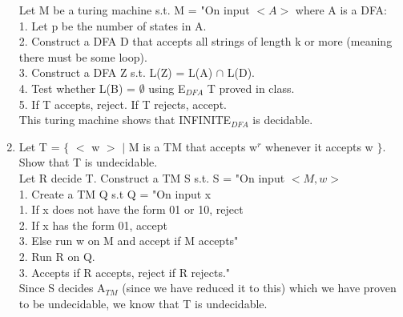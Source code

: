 \documentclass[12pt]{article}
\begin{document}
\begin{enumerate}
	\tabto{1cm}Let M be a turing machine s.t. M = "On input $<A>$ where A is a DFA: \\
	\tabto{2cm}1. Let p be the number of states in A. \\
	\tabto{2cm}2. Construct a DFA D that accepts all strings of length k or more (meaning 		\tabto{2cm}there must be some loop). \\
	\tabto{2cm}3. Construct a DFA Z s.t. L(Z) = L(A) $\cap$ L(D). \\
	\tabto{2cm}4. Test whether L(B) = $\emptyset$ using E$_{DFA}$ T proved in class. \\
	\tabto{2cm}5. If T accepts, reject. If T rejects, accept. \\ 
	
	This turing machine shows that INFINITE$_{DFA}$ is decidable.
	
	\item Let T = $\{$ $<$ w $>$ $|$ M is a TM that accepts w$^r$ whenever it accepts w $\}$. Show that T is undecidable. \\ 
	
	\tabto{1cm}Let R decide T. Construct a TM S s.t. S = "On input $<M,w>$ \\
		\tabto{2cm}1. Create a TM Q s.t Q = "On input x\\
			\tabto{3cm}1. If x does not have the form 01 or 10, reject\\
			\tabto{3cm}2. If x has the form 01, accept\\
			\tabto{3cm}3. Else run w on M and accept if M accepts"\\
		\tabto{2cm}2. Run R on Q.\\
		\tabto{2cm}3. Accepts if R accepts, reject if R rejects." \\
	
	Since S decides A$_{TM}$ (since we have reduced it to this) which we have proven to be undecidable, we know that T is undecidable.
\end{enumerate}
\end{document}
